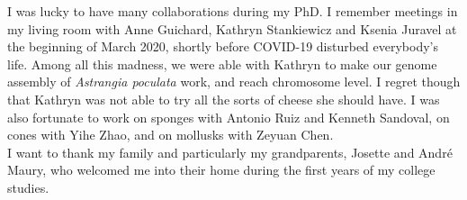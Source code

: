 I was lucky to have many collaborations during my PhD. I remember meetings in my living room with Anne Guichard, Kathryn Stankiewicz and Ksenia Juravel at the beginning of March 2020, shortly before COVID-19 disturbed everybody's life. Among all this madness, we were able with Kathryn to make our genome assembly of \textit{Astrangia poculata} work, and reach chromosome level. I regret though that Kathryn was not able to try all the sorts of cheese she should have. I was also fortunate to work on sponges with Antonio Ruiz and Kenneth Sandoval, on cones with Yihe Zhao, and on mollusks with Zeyuan Chen. \\

I want to thank my family and particularly my grandparents, Josette and André Maury, who welcomed me into their home during the first years of my college studies. 